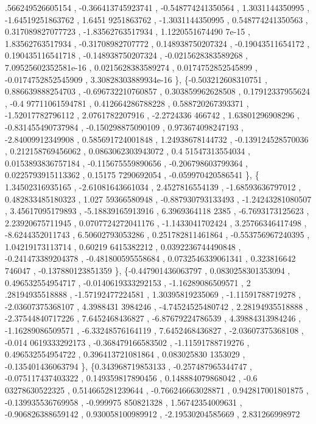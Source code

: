 \begin{DoxyCode}
      .566249526605154 , -0.366413745923741 , -0.548774241350564 ,   1.3031144350995 , -1.64519251863762 ,  1.6451
      9251863762 ,  -1.3031144350995 , 0.548774241350563 , 0.317089827077723 , -1.83562763517934 , 1.1220551674490
      7e-15 ,  1.83562763517934 , -0.31708982707772 , 0.148938750207324 , -0.19043511654172 , 0.190435116541718 , 
      -0.148938750207324 , -0.0215628383589268 , 7.09525602352581e-16 , 0.0215628383589274 , 0.0174752852545899 , 
      -0.0174752852545909 , 3.30828303889934e-16 \},
\{-0.503212608310751 , 0.886639888254703 , -0.696732210760857 , 0.303859962628508 ,  0.17912337955624 , -0.4
      97711061594781 , 0.412664286788228 , 0.588720267393371 , -1.52017782796112 ,   2.0761782207916 ,  -2.2724336
      466742 ,  1.63801296908296 , -0.831455490737984 , -0.150298875090109 , 0.973674098247193 , -2.84009912349908
       , 0.585691724001848 ,  1.24938678144732 , -0.139124528570036 , 0.212158769456062 , 0.0863062303943072 , 0.4
      51547313554034 , 0.0153893836757184 , -0.115675559890656 , -0.206798603799364 , 0.0225793915113362 , 0.15175
      7290692054 , -0.059970420586541 \},
\{ 1.34502316935165 , -2.61081643661034 ,   2.4527816554139 , -1.68593636797012 , 0.482833485180323 ,  1.027
      59366580948 , -0.887930793133493 , -1.24243281080507 ,  3.45617095179893 , -5.18839165913916 ,  6.3969364118
      2385 ,  -6.7693173125623 ,  2.23920675711945 , 0.0707724272041176 ,  -1.1433041702424 ,  3.25766346417498 , 
       -8.6244352011743 ,  6.50602793053286 , 0.251782811461864 , -0.553756967240395 ,  1.04219173113714 , 0.60219
      6415382212 , 0.0392236744490848 , -0.241473389204378 , -0.481800595558684 , 0.0732546339061341 , 0.323816642
      746047 , -0.137880123851359 \},
\{-0.447901436063797 , 0.0830258301353094 , 0.496532554954717 , -0.0140619333292153 , -1.16289086509571 ,  2
      .28194935518888 , -1.57192477224581 ,  1.30395819235069 , -1.11591788719278 , -2.03607375368107 ,  4.3988431
      3984246 , -4.74524525480742 ,  2.28194935518888 , -2.37544840717226 ,   7.6452468436827 , -6.87679224786539 
      ,  4.39884313984246 , -1.16289086509571 , -6.33248576164119 ,   7.6452468436827 , -2.03607375368108 , -0.014
      0619333292173 , -0.368479166583502 , -1.11591788719276 , 0.496532554954722 , 0.396413721081864 , 0.083025830
      1353029 , -0.135401436063794 \},
\{0.343968719853133 , -0.257487965344747 , -0.075117437403322 , 0.149359817890456 , 0.148884079868042 , -0.6
      03278630522325 , 0.514665281239644 , -0.766246663028871 , 0.942817001801875 , -0.139935536769958 , -0.999975
      850821328 ,  1.56742354009631 , -0.906826388659142 , 0.930058100989912 , -2.19530204585669 ,  2.831266998972

\end{DoxyCode}
